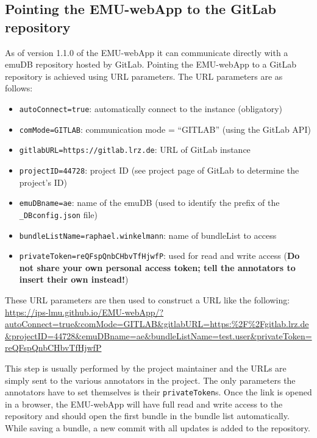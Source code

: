 \documentclass[]{book}
\providecommand{\tightlist}{%
  \setlength{\itemsep}{0pt}\setlength{\parskip}{0pt}}
\begin{document}
\hypertarget{pointing-the-emu-webapp-to-the-gitlab-repository}{%
\subsection{Pointing the EMU-webApp to the GitLab repository}\label{pointing-the-emu-webapp-to-the-gitlab-repository}}

As of version 1.1.0 of the EMU-webApp it can communicate directly with a emuDB repository hosted by GitLab. Pointing the EMU-webApp to a GitLab repository is achieved using URL parameters. The URL parameters are as follows:

\begin{itemize}
\tightlist
\item
  \texttt{autoConnect=true}: automatically connect to the instance (obligatory)
\item
  \texttt{comMode=GITLAB}: communication mode = ``GITLAB'' (using the GitLab API)
\item
  \texttt{gitlabURL=https://gitlab.lrz.de}: URL of GitLab instance
\item
  \texttt{projectID=44728}: project ID (see project page of GitLab to determine the project's ID)
\item
  \texttt{emuDBname=ae}: name of the emuDB (used to identify the prefix of the \texttt{\_DBconfig.json} file)
\item
  \texttt{bundleListName=raphael.winkelmann}: name of bundleList to access
\item
  \texttt{privateToken=reQFspQnbCHbvTfHjwfP}: used for read and write access (\textbf{Do not share your own personal access token; tell the annotators to insert their own instead!})
\end{itemize}

These URL parameters are then used to construct a URL like the following: \url{https://ips-lmu.github.io/EMU-webApp/?autoConnect=true\&comMode=GITLAB\&gitlabURL=https:\%2F\%2Fgitlab.lrz.de\&projectID=44728\&emuDBname=ae\&bundleListName=test.user\&privateToken=reQFspQnbCHbvTfHjwfP}

This step is usually performed by the project maintainer and the URLs are simply sent to the various annotators in the project. The only parameters the annotators have to set themselves is their \texttt{privateToken}s. Once the link is opened in a browser, the EMU-webApp will have full read and write access to the repository and should open the first bundle in the bundle list automatically. While saving a bundle, a new commit with all updates is added to the repository.
\end{document}
